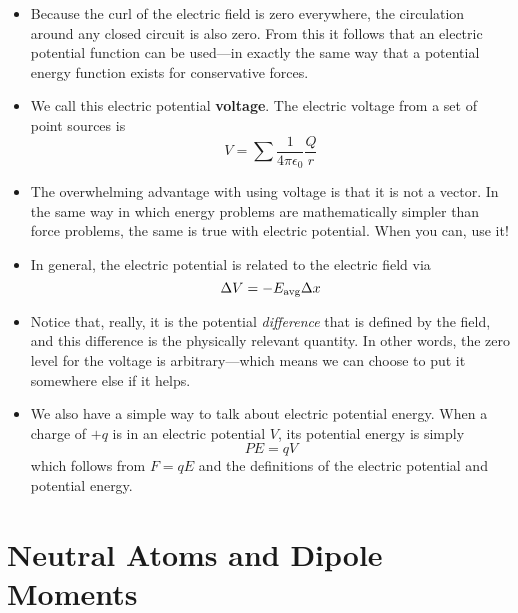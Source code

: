 \documentclass{article}
\begin{document}
%
\begin{itemize}

\item Because the curl of the electric field is zero everywhere, the circulation around any closed circuit is also zero. From this it follows that an electric potential function can be used---in exactly the same way that a potential energy function exists for conservative forces.

\item We call this electric potential \textbf{voltage}. The electric voltage from a set of point sources is
%
\begin{equation*}
V = \sum \frac{1}{4\pi\epsilon_0}\frac{Q}{r}
\end{equation*}
\item The overwhelming advantage with using voltage is that it is not a vector. In the same way in which energy problems are mathematically simpler than force problems, the same is true with electric potential. When you can, use it!

\item In general, the electric potential is related to the electric field via
%
\begin{equation*}
\Delta V = -E_\text{avg} \Delta x
\end{equation*}
\item Notice that, really, it is the potential \emph{difference} that is defined by the field, and this difference is the physically relevant quantity. In other words, the zero level for the voltage is arbitrary---which means we can choose to put it somewhere else if it helps.

\item We also have a simple way to talk about electric potential energy. When a charge of $+q$ is in an electric potential $V$, its potential energy is simply
%
\begin{equation*}
PE = qV
\end{equation*}
which follows from $F = qE$ and the definitions of the electric potential and potential energy.

\end{itemize}

\newpage
\section{Neutral Atoms and Dipole Moments}

\end{document}
